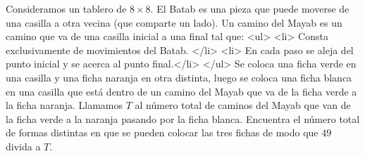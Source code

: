 Consideramos un tablero de $8 \times  8$. El Batab es una pieza que puede moverse de una casilla a otra vecina (que comparte un lado). Un camino del Mayab es un camino que va de una casilla inicial a una final tal que:
<ul>
<li> Consta exclusivamente de movimientos del Batab. </li>
<li> En cada paso se aleja del punto inicial y se acerca al punto final.</li>
</ul>
Se coloca una ficha verde en una casilla y una ficha naranja en otra distinta, luego se coloca una ficha blanca en una casilla que está dentro de un camino del Mayab que va de la ficha verde a la ficha naranja. Llamamos $T$ al número total de caminos del Mayab que van de la ficha verde a la naranja pasando por la ficha blanca. Encuentra el número total de formas distintas en que se pueden colocar las tres fichas de modo que $49$ divida a $T$.
